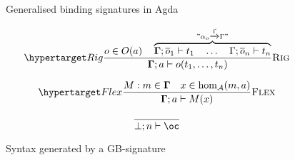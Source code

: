 \begin{figure}
\raggedright{}\caption{Generalised binding signatures in Agda\label{fig:sig-agda}}
\begin{minipage}[b]{0.65\columnwidth}%
\begin{flushleft}
\begin{AgdaAlign}
\end{AgdaAlign}
\par\end{flushleft}%
\end{minipage}
\end{figure}
\begin{figure*}
\begin{raggedright}
\caption{Syntax generated by a GB-signature\label{fig:sig-syntax}}
\par\end{raggedright}
\raggedright{}%
\begin{minipage}[c]{0.65\columnwidth}%
%
\end{minipage}%
\begin{minipage}[c]{0.65\columnwidth}%
%
\end{minipage}%
\begin{minipage}[c]{0.8\columnwidth}%
\[
\labellabelrule{\dfrac{o\in O(a)\quad\overbrace{\dotmcontext{\Gamma};\nthar o1\vdash t_{1}\quad\dots\quad\Gamma;\nthar on\vdash t_{n}}^{"\alpha_{o}\xrightarrow{\vec{t}}\Gamma"}}{\dotmcontext{\Gamma};a\vdash o(t_{1},\dots,t_{n})}}{Rig}
\]

\[
\labellabelrule{\dfrac{M:m\in\dotmcontext{\Gamma}\quad x\in\hom_{{\cal A}}(m,a)}{\dotmcontext{\Gamma};a\vdash M(x)}}{Flex}
\]

\[
\dfrac{}{\bot;n\vdash\bang}
\]
%
\end{minipage}
\end{figure*}

